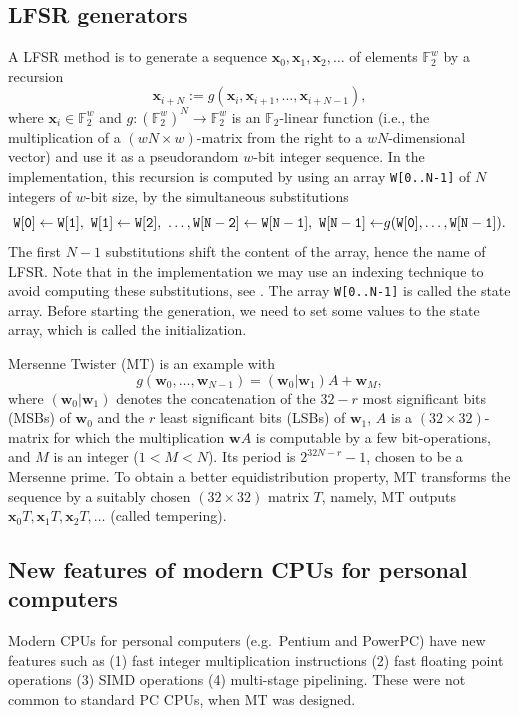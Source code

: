 \documentclass{svmult}
\def\F2{{\mathbb F}_2}
\def\bx{{{\mathbf x}}}
\def\bw{{{\mathbf w}}}
\begin{document}
\subsection{LFSR generators}
A LFSR method is to generate
a sequence $\bx_0, \bx_1, \bx_2, \ldots$
of elements $\F2^{w}$ by a recursion
\begin{equation}\label{eq:recursion}
\bx_{i+N}:=g(\bx_i, \bx_{i+1}, \ldots, \bx_{i+N-1}),
\end{equation}
where $\bx_i \in \F2^{w}$ and 
$g:(\F2^{w})^N \to \F2^{w}$ is an $\F2$-linear function
(i.e., the multiplication of a $(wN \times w)$-matrix 
from the right to a $wN$-dimensional vector)
and use it as a pseudorandom $w$-bit integer sequence.
In the implementation, this recursion is computed
by using an array {\tt W[0..N-1]} of $N$ integers of $w$-bit size,
by the simultaneous substitutions
$$
{\tt
W[0] \leftarrow W[1],\ 
W[1] \leftarrow W[2],\  \ldots,
W[N-2] \leftarrow W[N-1],\  
W[N-1] \leftarrow} g({\tt W[0]},\ldots,{\tt W[N-1]}). 
$$
The first $N-1$ substitutions shift the content of 
the array, hence the name of LFSR. 
Note that in the implementation we may use 
an indexing technique to avoid
computing these substitutions, see \cite[P.28 Algorithm A]{knuth:bible}.
The array {\tt W[0..N-1]} is called the state array.
Before starting the generation, we need to 
set some values to the state array, 
which is called the initialization. 

Mersenne Twister (MT) \cite{MT}
is an example with
$$
g(\bw_0,\ldots,\bw_{N-1})=(\bw_0|\bw_1)A + \bw_M,
$$
where $(\bw_0|\bw_1)$ denotes
the concatenation of 
the $32-r$ most significant bits (MSBs) of $\bw_0$ and 
the $r$ least significant bits (LSBs) of $\bw_1$,
$A$ is a $(32\times 32)$-matrix 
for which the multiplication $\bw A$ is computable 
by a few bit-operations, and $M$ is an integer
($1 < M < N$).
Its period is $2^{32N-r}-1$, chosen to be a Mersenne prime.
To obtain a better equidistribution property, 
MT transforms the sequence by
a suitably chosen $(32\times 32)$ matrix $T$,
namely, MT outputs
$\bx_0T , \bx_1T, \bx_2T, \ldots$
(called tempering).

\subsection{New features of modern CPUs for personal computers}
Modern CPUs for personal computers (e.g.\ Pentium and
PowerPC) have new features such as 
(1) fast integer multiplication instructions
(2) fast floating point operations 
(3) SIMD operations 
(4) multi-stage pipelining.
These were not common
to standard PC CPUs, when MT was designed.
\end{document}
